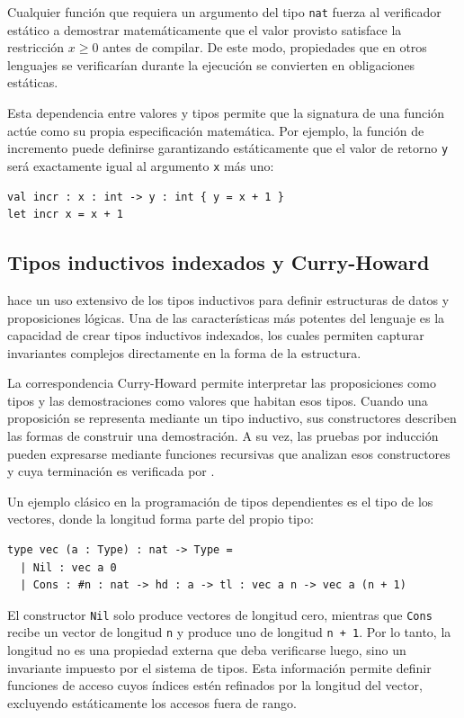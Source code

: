 \documentclass[a4paper,	11pt]{report}
\begin{document}
Cualquier función que requiera un argumento del tipo \lstinline|nat|
fuerza al verificador estático a demostrar matemáticamente que el valor provisto satisface la restricción $x \geq 0$ antes de compilar.
De este modo,
propiedades que en otros lenguajes se verificarían durante la ejecución se convierten en obligaciones estáticas.

Esta dependencia entre valores y tipos permite que la signatura de una función actúe como su propia especificación matemática.
Por ejemplo,
la función de incremento puede definirse garantizando estáticamente
que el valor de retorno \lstinline|y| será exactamente igual al argumento \lstinline|x| más uno:

\begin{lstlisting}
val incr : x : int -> y : int { y = x + 1 }
let incr x = x + 1
\end{lstlisting}

\subsection*{Tipos inductivos indexados y Curry-Howard}
\fstar{} hace un uso extensivo de los tipos inductivos para definir estructuras de datos y proposiciones lógicas.
Una de las características más potentes del lenguaje es la capacidad de crear tipos inductivos indexados,
los cuales permiten capturar invariantes complejos directamente en la forma de la estructura.

La correspondencia Curry-Howard \citep{howard} permite interpretar
las proposiciones como tipos y las demostraciones como valores que habitan esos tipos.
Cuando una proposición se representa mediante un tipo inductivo,
sus constructores describen las formas de construir una demostración.
A su vez,
las pruebas por inducción pueden expresarse mediante funciones recursivas que analizan esos constructores
y cuya terminación es verificada por \fstar{}.

Un ejemplo clásico en la programación de tipos dependientes es el tipo de los vectores,
donde la longitud forma parte del propio tipo:
\begin{lstlisting}
type vec (a : Type) : nat -> Type =
  | Nil : vec a 0
  | Cons : #n : nat -> hd : a -> tl : vec a n -> vec a (n + 1)
\end{lstlisting}
El constructor \lstinline|Nil| solo produce vectores de longitud cero,
mientras que \lstinline|Cons| recibe un vector de longitud \lstinline|n| y produce uno de longitud \lstinline|n + 1|.
Por lo tanto, la longitud no es una propiedad externa que deba verificarse luego,
sino un invariante impuesto por el sistema de tipos.
Esta información permite definir funciones de acceso cuyos índices estén refinados por la longitud del vector,
excluyendo estáticamente los accesos fuera de rango.
\end{document}
